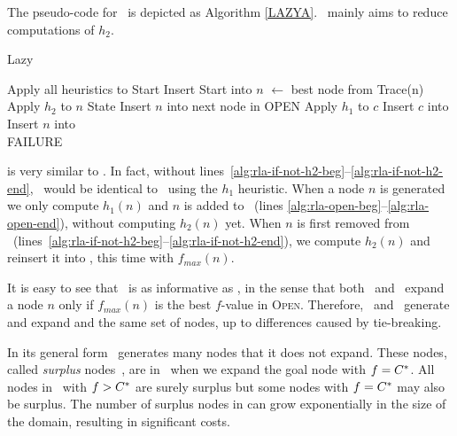 The pseudo-code for  \lazyastar~is depicted as Algorithm \ref{LAZYA}.
\lazyastar~mainly aims to reduce computations of $h_2$.
\begin{algorithm}[h]
\caption{Lazy \astar}
\begin{algorithmic}[1]
    \State Apply all heuristics to Start
    \State Insert Start into \OPEN
        \State $n$ $\gets$ best node from \OPEN
            \Return Trace(n)
        \EndIf
         \label{alg:rla-if-not-h2-beg}
            \State Apply $h_2$ to $n$
            State Insert $n$ into \OPEN
			 \Comment next node in OPEN
        \EndIf                           \label{alg:rla-if-not-h2-end}
                \label{alg:rla-open-beg}
            \State Apply $h_1$ to $c$
            \State Insert $c$ into \OPEN
        \EndFor                          \label{alg:rla-open-end}
        \State Insert $n$ into \CLOSED
    \EndWhile  \\
    \Return FAILURE
\EndProcedure
\end{algorithmic}
\label{LAZYA}
\end{algorithm}
\lazyastar is very similar to \astar.
In fact, without lines~\ref{alg:rla-if-not-h2-beg}--\ref{alg:rla-if-not-h2-end}, \lazyastar~would be identical to
\astar~using the $h_1$ heuristic.
When a node $n$ is generated we only compute $h_1(n)$ and $n$ is added to
\OPEN ~(lines \ref{alg:rla-open-beg}--\ref{alg:rla-open-end}), without computing $h_2(n)$ yet.
When $n$ is first removed from \OPEN~(lines~\ref{alg:rla-if-not-h2-beg}--\ref{alg:rla-if-not-h2-end}), we compute $h_2(n)$ and
reinsert it into \OPEN, this time with $f_{max}(n)$.

It is easy to see that \lazyastar~is as informative as \astarmax, in
the sense that both \astarmax~and \lazyastar~expand a node $n$ only
if $f_{max}(n)$ is the best $f$-value in \textsc{Open}.  Therefore,
\lazyastar~and \astarmax~generate and expand and the same set of
nodes, up to differences caused by tie-breaking.

In its general form \astar~generates many nodes that it does not expand. These
nodes, called {\em surplus} nodes~\cite{Felner2012}, are in \OPEN~when we
expand the goal node with $f=C^\ast$. All nodes in \OPEN~with $f>C^\ast$ are
surely surplus but some nodes with $f=C^\ast$ may also be surplus. The number
of surplus nodes in \OPEN can grow exponentially in the size of the domain, resulting in
significant costs.

